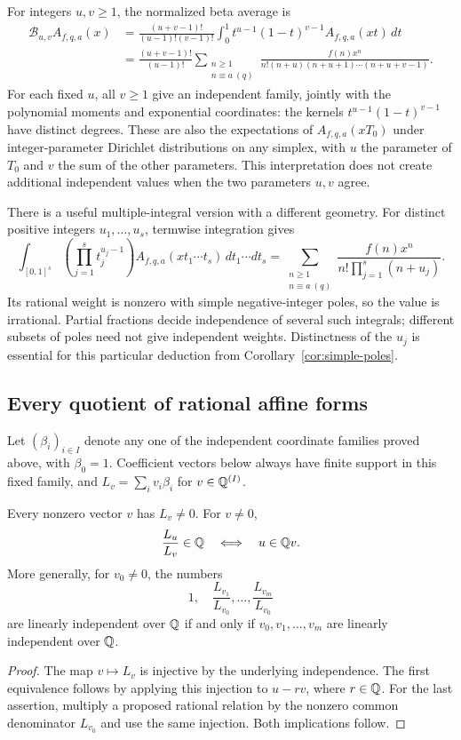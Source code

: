 For integers $u,v\geq1$, the normalized beta average is
\begin{align*}
 \mathcal B_{u,v}A_{f,q,a}(x)
 &=\frac{(u+v-1)!}{(u-1)!(v-1)!}
     \int_0^1t^{u-1}(1-t)^{v-1}A_{f,q,a}(xt)\,dt\\
 &=\frac{(u+v-1)!}{(u-1)!}
   \sum_{\substack{n\geq1\\n\equiv a\ (q)}}
   \frac{f(n)x^n}{n!(n+u)(n+u+1)\cdots(n+u+v-1)}.
\end{align*}
For each fixed $u$, all $v\geq1$ give an independent family, jointly
with the polynomial moments and exponential coordinates: the kernels
$t^{u-1}(1-t)^{v-1}$ have distinct degrees.  These are also the expectations
of $A_{f,q,a}(xT_0)$ under integer-parameter Dirichlet distributions on
any simplex, with $u$ the parameter of $T_0$ and $v$ the sum of the other
parameters.  This interpretation does not create additional independent
values when the two parameters $u,v$ agree.

There is a useful multiple-integral version with a different geometry.
For distinct positive integers $u_1,\ldots,u_s$, termwise integration gives
\[
 \int_{[0,1]^s}\left(\prod_{j=1}^s t_j^{u_j-1}\right)
 A_{f,q,a}(x t_1\cdots t_s)\,dt_1\cdots dt_s
 =\sum_{\substack{n\geq1\\n\equiv a\ (q)}}
       \frac{f(n)x^n}{n!\prod_{j=1}^s(n+u_j)}.
\]
Its rational weight is nonzero with simple negative-integer poles,
so the value is irrational.  Partial fractions decide independence of
several such integrals; different subsets of poles need not give
independent weights.  Distinctness of the $u_j$ is essential for this
particular deduction from Corollary~\ref{cor:simple-poles}.

\subsection{Every quotient of rational affine forms}

Let $(\beta_i)_{i\in I}$ denote any one of the independent coordinate
families proved above, with $\beta_0=1$.  Coefficient vectors below always
have finite support in this fixed family, and
$L_v=\sum_i v_i\beta_i$ for $v\in\mathbb Q^{(I)}$.

\begin{theorem}
\label{thm:projective-rank}
Every nonzero vector $v$ has $L_v\ne0$.  For $v\ne0$,
\[
 \frac{L_u}{L_v}\in\mathbb Q
 \quad\Longleftrightarrow\quad u\in\mathbb Q v.
\]
More generally, for $v_0\ne0$, the numbers
\[
 1,\quad\frac{L_{v_1}}{L_{v_0}},\ldots,
          \frac{L_{v_m}}{L_{v_0}}
\]
are linearly independent over $\mathbb Q$ if and only if
$v_0,v_1,\ldots,v_m$ are linearly independent over $\mathbb Q$.
\end{theorem}
\begin{proof}
The map $v\mapsto L_v$ is injective by the underlying independence.
The first equivalence follows by applying this injection to $u-rv$,
where $r\in\mathbb Q$.  For the last assertion, multiply a proposed rational
relation by the nonzero common denominator $L_{v_0}$ and use the same
injection.  Both implications follow.
\end{proof}

